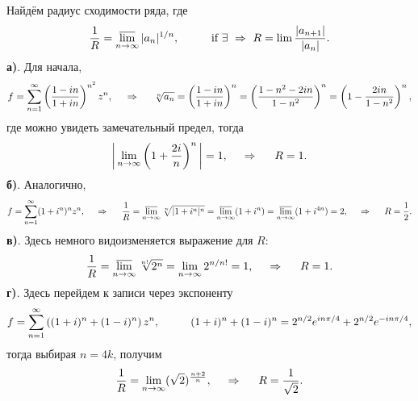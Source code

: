 
Найдём радиус сходимости ряда, где
\begin{equation*}
    \frac{1}{R} = \uplim_{n \to \infty} |a_n|^{1/n},
    \hspace{10 mm} 
    \text{if } \exists \ \Rightarrow \ 
    R = \lim \frac{|a_{n+1}|}{|a_n|}.
\end{equation*}
\textbf{а)}. Для начала,
\begin{equation*}
    f = \sum_{n=1}^{\infty} \left(\frac{1-in}{1+in}\right)^{n^2} z^n,
    \hspace{0.5cm} \Rightarrow \hspace{0.5cm}
    \sqrt[n]{a_n} = \left(\frac{1-in}{1+in}\right)^n = 
    \left(\frac{1 - n^2 - 2 in}{1-n^2}\right)^n = \left(1 - \frac{2 i n}{1-n^2}\right)^n,
\end{equation*}
где можно увидеть замечательный предел, тогда
\begin{equation*}
    \bigg|
        \lim_{n \to \infty} \left(1 + \frac{2i}{n}\right)^n
    \bigg| = 1,
    \hspace{0.5cm} \Rightarrow \hspace{0.5cm}
    R = 1.
\end{equation*}
\textbf{б)}. Аналогично,
\begin{equation*}
    f = \sum_{n=1}^{\infty} (1 + i^n)^n z^n,
    \hspace{0.5cm} \Rightarrow \hspace{0.5cm}
    \frac{1}{R} = 
    \operatorname*{\overline{lim}}_{n \to \infty} \sqrt[n]{|1+i^n|^n} = 
    \operatorname*{\overline{lim}}_{n \to \infty} (1 + i^n) = 
    \operatorname*{\overline{lim}}_{n \to \infty} (1 + i^{4n}) = 2,
    \hspace{0.5cm} \Rightarrow \hspace{0.5cm}
    R = \frac{1}{2}.
\end{equation*}
\textbf{в)}. Здесь немного видоизменяется выражение для $R$:
\begin{equation*}
    \frac{1}{R} = \operatorname*{\overline{lim}}_{n \to \infty} \sqrt[n!]{2^n} = 
    \lim_{n \to \infty} 2^{n/n!} = 1,
    \hspace{0.5cm} \Rightarrow \hspace{0.5cm}
    R = 1.
\end{equation*}
\textbf{г)}. Здесь перейдем к записи через экспоненту
\begin{equation*}
    f = \sum_{n=1}^{\infty} \left((1+i)^n + (1-i)^n\right) z^n,
    \hspace{10 mm}  
    (1+i)^n + (1-i)^n = 2^{n/2} e^{i n \pi/4} + 2^{n/2} e^{- i n \pi /4},
\end{equation*}
тогда выбирая $n = 4 k$, получим
\begin{equation*}
    \frac{1}{R} = \lim_{n \to \infty} (\sqrt{2})^{\frac{n+2}{n}},
    \hspace{0.5cm} \Rightarrow \hspace{0.5cm}
    R = \frac{1}{\sqrt{2}}.
\end{equation*}



